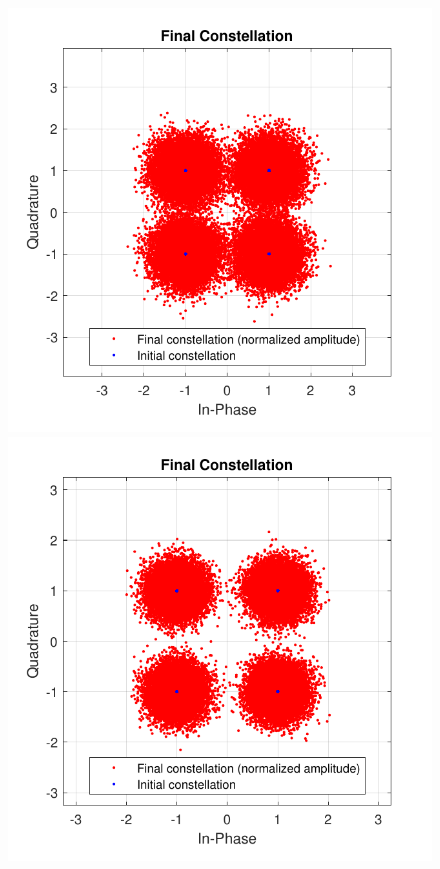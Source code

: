 \begin{figure}[h]
	\centering
	\begin{minipage}{0.33\textwidth}
		\centering
		\includegraphics[width=1\textwidth]{sdf/m_qam_system/figures/simulations/03_eNoise/constFinal_G5_20km.pdf}
	\end{minipage}
	\begin{minipage}{0.33\textwidth}
		\centering
		\includegraphics[width=1\textwidth]{sdf/m_qam_system/figures/simulations/03_eNoise/constFinal_G10_20km.pdf}

\end{minipage}
\end{figure}
